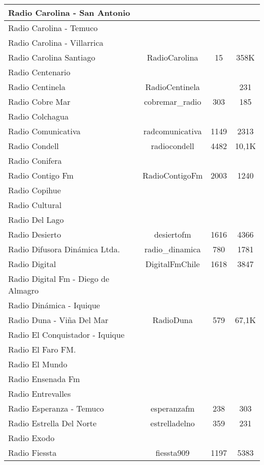 \begin{center}
\begin{longtable}{| l | c | c | c |}
Radio Carolina - San Antonio	&		&		&		\\ \hline
Radio Carolina - Temuco	&		&		&		\\ \hline
Radio Carolina - Villarrica	&		&		&		\\ \hline
Radio Carolina Santiago	&	RadioCarolina	&	15	&	358K	\\ \hline
Radio Centenario	&		&		&		\\ \hline
Radio Centinela	&	RadioCentinela	&		&	231	\\ \hline
Radio Cobre Mar	&	cobremar\_radio	&	303	&	185	\\ \hline
Radio Colchagua	&		&		&		\\ \hline
Radio Comunicativa	&	radcomunicativa	&	1149	&	2313	\\ \hline
Radio Condell	&	radiocondell	&	4482	&	10,1K	\\ \hline
Radio Conifera	&		&		&		\\ \hline
Radio Contigo Fm	&	RadioContigoFm	&	2003	&	1240	\\ \hline
Radio Copihue	&		&		&		\\ \hline
Radio Cultural	&		&		&		\\ \hline
Radio Del Lago	&		&		&		\\ \hline
Radio Desierto	&	desiertofm	&	1616	&	4366	\\ \hline
Radio Difusora Dinámica Ltda.	&	radio\_dinamica	&	780	&	1781	\\ \hline
Radio Digital	&	DigitalFmChile	&	1618	&	3847	\\ \hline
Radio Digital Fm - Diego de Almagro	&		&		&		\\ \hline
Radio Dinámica - Iquique	&		&		&		\\ \hline
Radio Duna - Viña Del Mar	&	RadioDuna	&	579	&	67,1K	\\ \hline
Radio El Conquistador - Iquique	&		&		&		\\ \hline
Radio El Faro FM.	&		&		&		\\ \hline
Radio El Mundo	&		&		&		\\ \hline
Radio Ensenada Fm	&		&		&		\\ \hline
Radio Entrevalles	&		&		&		\\ \hline
Radio Esperanza - Temuco	&	esperanzafm	&	238	&	303	\\ \hline
Radio Estrella Del Norte	&	estrelladelno	&	359	&	231	\\ \hline
Radio Exodo	&		&		&		\\ \hline
Radio Fiessta	&	fiessta909	&	1197	&	5383	\\ \hline

\end{longtable}
\end{center}
